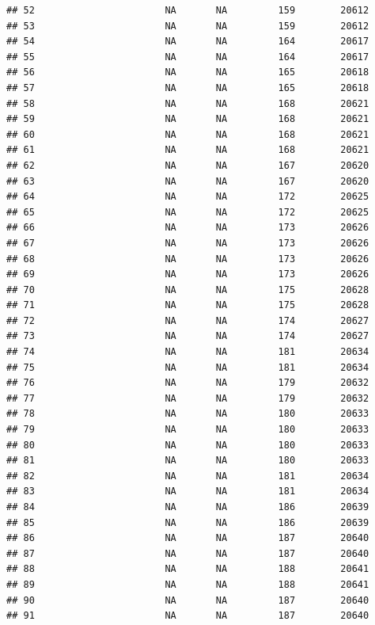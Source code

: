 \documentclass[
]{article}
\begin{document}
\begin{verbatim}
## 52                       NA       NA         159        20612
## 53                       NA       NA         159        20612
## 54                       NA       NA         164        20617
## 55                       NA       NA         164        20617
## 56                       NA       NA         165        20618
## 57                       NA       NA         165        20618
## 58                       NA       NA         168        20621
## 59                       NA       NA         168        20621
## 60                       NA       NA         168        20621
## 61                       NA       NA         168        20621
## 62                       NA       NA         167        20620
## 63                       NA       NA         167        20620
## 64                       NA       NA         172        20625
## 65                       NA       NA         172        20625
## 66                       NA       NA         173        20626
## 67                       NA       NA         173        20626
## 68                       NA       NA         173        20626
## 69                       NA       NA         173        20626
## 70                       NA       NA         175        20628
## 71                       NA       NA         175        20628
## 72                       NA       NA         174        20627
## 73                       NA       NA         174        20627
## 74                       NA       NA         181        20634
## 75                       NA       NA         181        20634
## 76                       NA       NA         179        20632
## 77                       NA       NA         179        20632
## 78                       NA       NA         180        20633
## 79                       NA       NA         180        20633
## 80                       NA       NA         180        20633
## 81                       NA       NA         180        20633
## 82                       NA       NA         181        20634
## 83                       NA       NA         181        20634
## 84                       NA       NA         186        20639
## 85                       NA       NA         186        20639
## 86                       NA       NA         187        20640
## 87                       NA       NA         187        20640
## 88                       NA       NA         188        20641
## 89                       NA       NA         188        20641
## 90                       NA       NA         187        20640
## 91                       NA       NA         187        20640

\end{verbatim}
\end{document}
